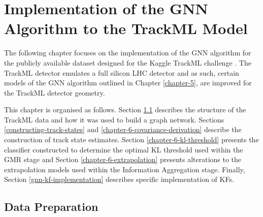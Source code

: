 


\chapter{Implementation of the GNN Algorithm to the TrackML Model}
\label{chapter-6}

The following chapter focuses on the implementation of the GNN algorithm for the publicly available dataset designed for the Kaggle TrackML challenge \cite{kaggle-trackml}. The TrackML detector emulates a full silicon LHC detector and as such, certain models of the GNN algorithm outlined in Chapter \ref{chapter-5}, are improved for the TrackML detector geometry.

This chapter is organised as follows. Section \ref{chapter-6-data-prep} describes the structure of the TrackML data and how it was used to build a graph network. Sections \ref{constructing-track-states} and \ref{chapter-6-covariance-derivation} describe the construction of track state estimates. Section \ref{chapter-6-kl-threshold} presents the classifier constructed to determine the optimal KL threshold used within the GMR stage and Section \ref{chapter-6-extrapolation} presents alterations to the extrapolation models used within the Information Aggregation stage. Finally, Section \ref{gnn-kf-implementation} describes specific implementation of KFs. 
 





\section{Data Preparation}
\label{chapter-6-data-prep}


